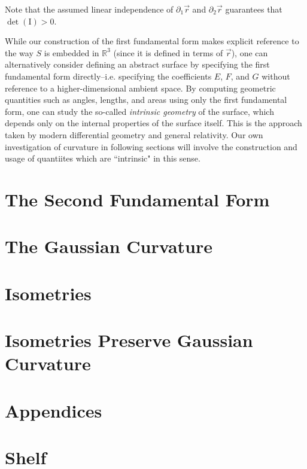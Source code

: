\documentclass{article}
\begin{document}
Note that the assumed linear independence of $\partial_1 \vec{r}$ and $\partial_2 \vec{r}$ guarantees that $\det(\mathrm{I}) > 0$.

While our construction of the first fundamental form makes explicit reference to the way $S$ is embedded in $\mathbb{R}^3$ (since it is defined in terms of $\vec{r}$), one can alternatively consider defining an abstract surface by specifying the first fundamental form directly--i.e. specifying the coefficients $E$, $F$, and $G$ without reference to a higher-dimensional ambient space. By computing geometric quantities such as angles, lengths, and areas using only the first fundamental form, one can study the so-called \textit{intrinsic geometry} of the surface, which depends only on the internal properties of the surface itself. This is the approach taken by modern differential geometry and general relativity. Our own investigation of curvature in following sections will involve the construction and usage of quantiites which are ``intrinsic" in this sense.

\section{The Second Fundamental Form}

\section{The Gaussian Curvature}

\section{Isometries}

\section{Isometries Preserve Gaussian Curvature}

\section{Appendices}

\section{Shelf}
\end{document}
